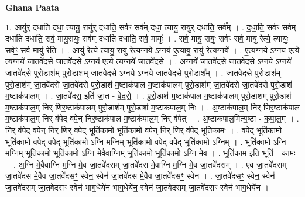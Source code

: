 \documentclass[17pt]{extarticle}
\begin{document}
\textbf{Ghana Paata } \newline

1. आयु॑र् दधाति दधा॒ त्यायु॒ रायु॑र् दधाति॒ सर्वꣳ॒॒ सर्व॑म् दधा॒ त्यायु॒ रायु॑र् दधाति॒ सर्व᳚म् । . द॒धा॒ति॒ सर्वꣳ॒॒ सर्व॑म् दधाति दधाति॒ सर्व॒ मायु॒रायुः॒ सर्व॑म् दधाति दधाति॒ सर्व॒ मायुः॑ । . सर्व॒ मायु॒ रायुः॒ सर्वꣳ॒॒ सर्व॒ मायु॑ रेत्ये॒ त्यायुः॒ सर्वꣳ॒॒ सर्व॒ मायु॑ रेति । . आयु॑ रेत्ये॒ त्यायु॒ रायु॑ रेत्य॒ग्नये॒ ऽग्नय॑ ए॒त्यायु॒ रायु॑ रेत्य॒ग्नये᳚ । . ए॒त्य॒ग्नये॒ ऽग्नय॑ एत्ये त्य॒ग्नये॑ जा॒तवे॑दसे जा॒तवे॑दसे॒ ऽग्नय॑ एत्ये त्य॒ग्नये॑ जा॒तवे॑दसे । . अ॒ग्नये॑ जा॒तवे॑दसे जा॒तवे॑दसे॒ ऽग्नये॒ ऽग्नये॑ जा॒तवे॑दसे पुरो॒डाश॑म् पुरो॒डाश॑म् जा॒तवे॑दसे॒ ऽग्नये॒ ऽग्नये॑ जा॒तवे॑दसे पुरो॒डाश᳚म् । . जा॒तवे॑दसे पुरो॒डाश॑म् पुरो॒डाश॑म् जा॒तवे॑दसे जा॒तवे॑दसे पुरो॒डाश॑ म॒ष्टाक॑पाल म॒ष्टाक॑पालम् पुरो॒डाश॑म् जा॒तवे॑दसे जा॒तवे॑दसे पुरो॒डाश॑ म॒ष्टाक॑पालम् । . जा॒तवे॑दस॒ इति॑ जा॒त - वे॒द॒से॒ । . पु॒रो॒डाश॑ म॒ष्टाक॑पाल म॒ष्टाक॑पालम् पुरो॒डाश॑म् पुरो॒डाश॑ म॒ष्टाक॑पाल॒म् निर् णिर॒ष्टाक॑पालम् पुरो॒डाश॑म् पुरो॒डाश॑ म॒ष्टाक॑पाल॒म् निः । . अ॒ष्टाक॑पाल॒म् निर् णिर॒ष्टाक॑पाल म॒ष्टाक॑पाल॒म् निर् व॑पेद् वपे॒न् निर॒ष्टाक॑पाल म॒ष्टाक॑पाल॒म् निर् व॑पेत् । . अ॒ष्टाक॑पाल॒मित्य॒ष्टा - क॒पा॒ल॒म् । . निर् व॑पेद् वपे॒न् निर् णिर् व॑पे॒द् भूति॑कामो॒ भूति॑कामो वपे॒न् निर् णिर् व॑पे॒द् भूति॑कामः । . व॒पे॒द् भूति॑कामो॒ भूति॑कामो वपेद् वपे॒द् भूति॑कामो॒ ऽग्नि म॒ग्निम् भूति॑कामो वपेद् वपे॒द् भूति॑कामो॒ ऽग्निम् । . भूति॑कामो॒ ऽग्नि म॒ग्निम् भूति॑कामो॒ भूति॑कामो॒ ऽग्नि मे॒वैवाग्निम् भूति॑कामो॒ भूति॑कामो॒ ऽग्नि मे॒व । . भूति॑काम॒ इति॒ भूति॑ - का॒मः॒ । . अ॒ग्नि मे॒वैवाग्नि म॒ग्नि मे॒व जा॒तवे॑दसम् जा॒तवे॑दस मे॒वाग्नि म॒ग्नि मे॒व जा॒तवे॑दसम् । . ए॒व जा॒तवे॑दसम् जा॒तवे॑दस मे॒वैव जा॒तवे॑दसꣳ॒॒ स्वेन॒ स्वेन॑ जा॒तवे॑दस मे॒वैव जा॒तवे॑दसꣳ॒॒ स्वेन॑ । . जा॒तवे॑दसꣳ॒॒ स्वेन॒ स्वेन॑ जा॒तवे॑दसम् जा॒तवे॑दसꣳ॒॒ स्वेन॑ भाग॒धेये॑न भाग॒धेये॑न॒ स्वेन॑ जा॒तवे॑दसम् जा॒तवे॑दसꣳ॒॒ स्वेन॑ भाग॒धेये॑न । \newline
\end{document}
